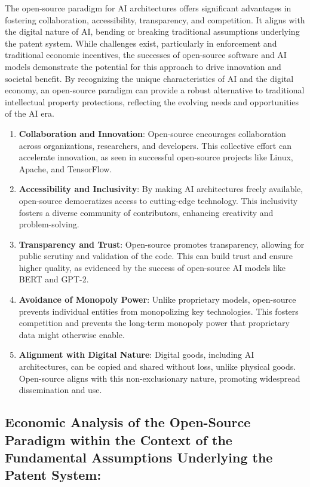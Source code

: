 \documentclass{article}[10pt]
\begin{document}
The open-source paradigm for AI architectures offers significant advantages in fostering collaboration, accessibility, transparency, and competition. It aligns with the digital nature of AI, bending or breaking traditional assumptions underlying the patent system. While challenges exist, particularly in enforcement and traditional economic incentives, the successes of open-source software and AI models demonstrate the potential for this approach to drive innovation and societal benefit. By recognizing the unique characteristics of AI and the digital economy, an open-source paradigm can provide a robust alternative to traditional intellectual property protections, reflecting the evolving needs and opportunities of the AI era.

\begin{enumerate}
	\item \textbf{Collaboration and Innovation}: Open-source encourages collaboration across organizations, researchers, and developers. This collective effort can accelerate innovation, as seen in successful open-source projects like Linux, Apache, and TensorFlow.
	\item \textbf{Accessibility and Inclusivity}: By making AI architectures freely available, open-source democratizes access to cutting-edge technology. This inclusivity fosters a diverse community of contributors, enhancing creativity and problem-solving.
	\item \textbf{Transparency and Trust}: Open-source promotes transparency, allowing for public scrutiny and validation of the code. This can build trust and ensure higher quality, as evidenced by the success of open-source AI models like BERT and GPT-2.
	\item \textbf{Avoidance of Monopoly Power}: Unlike proprietary models, open-source prevents individual entities from monopolizing key technologies. This fosters competition and prevents the long-term monopoly power that proprietary data might otherwise enable.
	\item \textbf{Alignment with Digital Nature}: Digital goods, including AI architectures, can be copied and shared without loss, unlike physical goods. Open-source aligns with this non-exclusionary nature, promoting widespread dissemination and use.
\end{enumerate}

\subsection{Economic Analysis of the Open-Source Paradigm within the Context of the Fundamental Assumptions Underlying the Patent System:}
\end{document}

